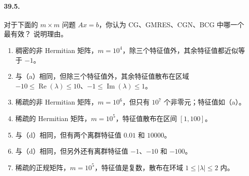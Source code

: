 \documentclass[UTF8,fontset=none,12pt]{ctexart}
\begin{document}
\paragraph{39.5.}
对于下面的 $m\times m$ 问题 $Ax=b$，你认为 CG、GMRES、CGN、BCG 中哪一个最有效？
说明理由。

\begin{enumerate}[label=(\alph*)]
\item 稠密的非 Hermitian 矩阵，$m=10^4$，除三个特征值外，其余特征值都近似等于 $-1$。
\item 与（a）相同，但除三个特征值外，其余特征值散布在区域
$-10\leq\operatorname{Re}(\lambda)\leq10$、$-1\leq\operatorname{Im}(\lambda)\leq1$。
\item 稀疏的非 Hermitian 矩阵，$m=10^6$，但只有 $10^7$ 个非零元；特征值如（a）。
\item 稀疏的 Hermitian 矩阵，$m=10^5$，特征值散布在区间 $[1,100]$。
\item 与（d）相同，但有两个离群特征值 $0.01$ 和 $10000$。
\item 与（d）相同，但另外还有离群特征值 $-1$、$-10$ 和 $-100$。
\item 稀疏的正规矩阵，$m=10^5$，特征值是复数，散布在环域
$1\leq|\lambda|\leq2$ 内。
\end{enumerate}
\end{document}
